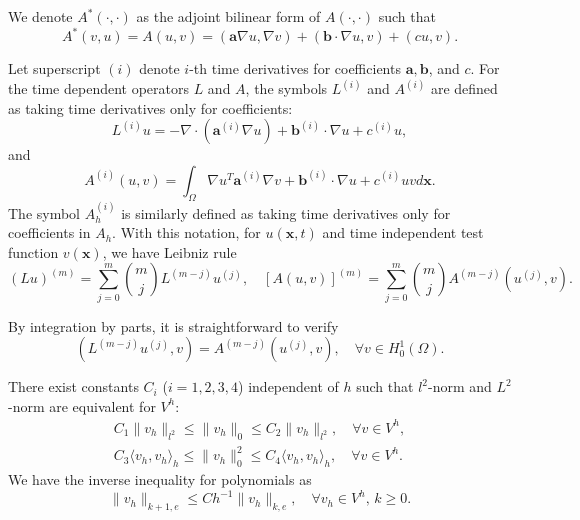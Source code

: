 \documentclass[onefignum,onetabnum]{siamart171218}
\begin{document}
We denote $A^{*}(\cdot, \cdot)$ as the adjoint bilinear form of $A(\cdot, \cdot)$ such that
\[
A^{*}(v, u)=A(u, v)=(\mathbf{a} \nabla u, \nabla v)+(\mathbf{b} \cdot \nabla u, v)+(c u, v).
\]

Let superscript $(i)$ denote $i$-th time derivatives for coefficients $\mathbf a, \mathbf b$, and $c$. 
For the time dependent operators $L$ and $A$, the symbols $L^{(i)}$ and $A^{(i)}$ are defined as taking time derivatives only for coefficients:
\[ 
L^{(i)}u = -\nabla\cdot(\mathbf a^{(i)}\nabla u) + \mathbf b^{(i)}\cdot \nabla u + c^{(i)}u,\]
and
\[A^{(i)}(u,v) = \int_{\Omega}\nabla u^T \mathbf a^{(i)}\nabla v+ \mathbf b^{(i)}\cdot \nabla u + c^{(i)}uv d\mathbf x. \]
The symbol $A^{(i)}_h$ is similarly defined as taking time derivatives only for coefficients in $A_h$. 
With this notation, for $u(\mathbf x,t)$ and time independent test function $v(\mathbf x)$, we have Leibniz rule 
$$(L u)^{(m)}=\sum_{j=0}^m \binom{m}{j} L^{(m-j)} u^{(j)},\quad \left[A(u,v)\right]^{(m)}= \sum_{j=0}^m \binom{m}{j} A^{(m-j)} (u^{(j)}, v).$$

 By integration by parts, it is straightforward to verify
\begin{equation}
\label{notation-formula-1}
(L ^{(m-j)} u^{(j)},v)= A^{(m-j)} (u^{(j)}, v),\quad\forall  v\in H_0^1(\Omega).
\end{equation}

 There exist constants $C_i$ ($i=1,2,3,4$) independent of $h$ such that $l^2$-norm and $L^2$-norm are equivalent for $V^h$:
\begin{equation}\label{norm-equivalence}
\begin{aligned}
C_1\|v_h\|_{l^2} \leq \|v_h\|_0 \leq C_2\|v_h\|_{l^2}, \quad  \forall v \in V^h,\\
C_3\langle v_h, v_h\rangle_h \leq \|v_h\|^2_0 \leq C_4 \langle v_h, v_h\rangle_h, \quad \forall v \in V^h.
\end{aligned}
\end{equation}
We have the inverse inequality for polynomials as
 \begin{equation}
 \|v_h\|_{k+1, e}\leq C h^{-1} \|v_h\|_{k, e},\quad  \forall v_h \in V^h,\, k\geq 0. 
\label{inverseestimate}
 \end{equation}

  


% 
\end{document}
